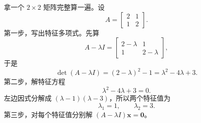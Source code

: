 \documentclass[UTF8,a4paper,12pt]{ctexart}
\numberwithin{equation}{section}
\begin{document}
	拿一个 $2\times 2$ 矩阵完整算一遍。设
	\begin{equation}\label{eq:7.4}
	A=
	\begin{bmatrix}
		2&1\\
		1&2
	\end{bmatrix}.
	\end{equation}
	第一步，写出特征多项式。先算
	\begin{equation}\label{eq:7.5}
	A-\lambda I=
	\begin{bmatrix}
		2-\lambda&1\\
		1&2-\lambda
	\end{bmatrix},
	\end{equation}
	于是
	\begin{equation}\label{eq:7.6}
	\det(A-\lambda I)
	=(2-\lambda)^2-1
	=\lambda^2-4\lambda+3.
	\end{equation}
	第二步，解特征方程
	\begin{equation}\label{eq:7.7}
	\lambda^2-4\lambda+3=0.
	\end{equation}
	左边因式分解成 $(\lambda-1)(\lambda-3)$，所以两个特征值为
	\begin{equation}\label{eq:7.8}
	\lambda_1=1,\qquad \lambda_2=3.
	\end{equation}
	第三步，对每个特征值分别解 $(A-\lambda I)\bm{x}=\bm{0}$。
\end{document}
